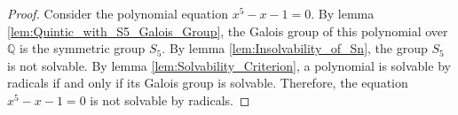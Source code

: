\begin{proof}
    Consider the polynomial equation $x^5 - x - 1 = 0$.
    By lemma \ref{lem:Quintic_with_S5_Galois_Group}, the Galois group of this polynomial over $\mathbb{Q}$ is the symmetric group $S_5$.
    By lemma \ref{lem:Insolvability_of_Sn}, the group $S_5$ is not solvable.
    By lemma \ref{lem:Solvability_Criterion}, a polynomial is solvable by radicals if and only if its Galois group is solvable.
    Therefore, the equation $x^5 - x - 1 = 0$ is not solvable by radicals.
\end{proof}
